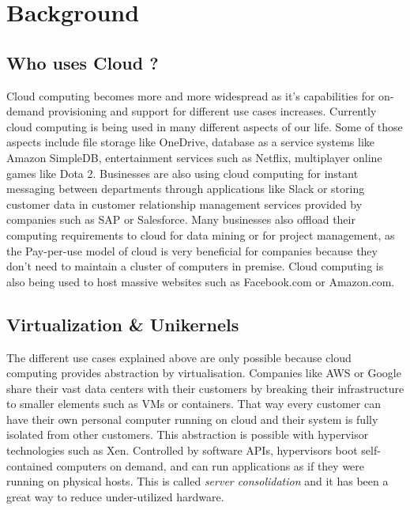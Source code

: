 
\chapter{Background}\label{chapter:background} %

\section{Who uses Cloud ?} %
Cloud computing becomes more and more widespread as it's capabilities for on-demand provisioning and support for different use cases increases. Currently cloud computing is being used in many different aspects of our life. \cite{cloud-use-cases} Some of those aspects include file storage like OneDrive, database as a service systems like Amazon SimpleDB, entertainment services such as Netflix, multiplayer online games like Dota 2. Businesses are also using cloud computing for instant messaging between departments through applications like Slack or storing customer data in customer relationship management services provided by companies such as SAP or Salesforce. Many businesses also offload their computing requirements to cloud for data mining or for project management, as the Pay-per-use model of cloud is very beneficial for companies because they don't need to maintain a cluster of computers in premise. Cloud computing is also being used to host massive websites such as Facebook.com or Amazon.com.

\section{Virtualization \& Unikernels}
The different use cases explained above are only possible because cloud computing provides abstraction by virtualisation. Companies like AWS or Google share their vast data centers with their customers by breaking their infrastructure to smaller elements such as VMs or containers. That way every customer can have their own personal computer running on cloud and their system is fully isolated from other customers. This abstraction is possible with hypervisor technologies such as Xen. Controlled by software APIs, hypervisors boot self-contained computers on demand, and can run applications as if they were running on physical hosts. This is called \textit{server consolidation} and it has been a great way to reduce under-utilized hardware.

